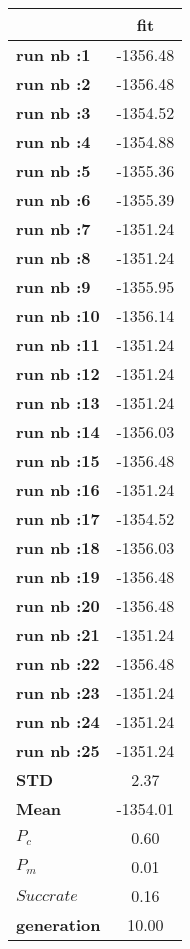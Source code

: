 \begin{tiny}\begin{tabular}{|l|c|}
\hline
&\textbf{fit}\\\hline
\textbf{run nb :1}&-1356.48\\\hline
\textbf{run nb :2}&-1356.48\\\hline
\textbf{run nb :3}&-1354.52\\\hline
\textbf{run nb :4}&-1354.88\\\hline
\textbf{run nb :5}&-1355.36\\\hline
\textbf{run nb :6}&-1355.39\\\hline
\textbf{run nb :7}&-1351.24\\\hline
\textbf{run nb :8}&-1351.24\\\hline
\textbf{run nb :9}&-1355.95\\\hline
\textbf{run nb :10}&-1356.14\\\hline
\textbf{run nb :11}&-1351.24\\\hline
\textbf{run nb :12}&-1351.24\\\hline
\textbf{run nb :13}&-1351.24\\\hline
\textbf{run nb :14}&-1356.03\\\hline
\textbf{run nb :15}&-1356.48\\\hline
\textbf{run nb :16}&-1351.24\\\hline
\textbf{run nb :17}&-1354.52\\\hline
\textbf{run nb :18}&-1356.03\\\hline
\textbf{run nb :19}&-1356.48\\\hline
\textbf{run nb :20}&-1356.48\\\hline
\textbf{run nb :21}&-1351.24\\\hline
\textbf{run nb :22}&-1356.48\\\hline
\textbf{run nb :23}&-1351.24\\\hline
\textbf{run nb :24}&-1351.24\\\hline
\textbf{run nb :25}&-1351.24\\\hline
\textbf{STD}&2.37\\\hline
\textbf{Mean}&-1354.01\\\hline
\textbf{$P_c$}&0.60\\\hline
\textbf{$P_{m}$}&0.01\\\hline
\textbf{$Succ rate$}&0.16\\\hline
\textbf{generation}&10.00\\\hline
\end{tabular}
\end{tiny}